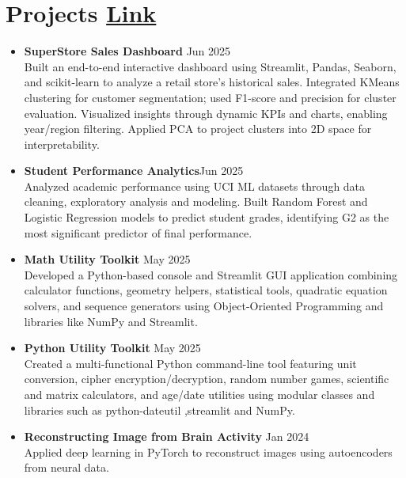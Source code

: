 \documentclass[10 pt, letterpaper]{article}
\begin{document}
\section*{Projects \textbar \href{https://github.com/Seetharamanrs?tab=repositories} {Link}}
\begin{itemize}
 \item \textbf{SuperStore Sales Dashboard } \hfill{Jun 2025} \\Built an end-to-end interactive dashboard using Streamlit, Pandas, Seaborn, and scikit-learn to analyze a retail store’s historical sales. Integrated KMeans clustering for customer segmentation; used F1-score and precision for cluster evaluation. Visualized insights through dynamic KPIs and charts, enabling year/region filtering. Applied PCA to project clusters into 2D space for interpretability.

    \vspace{-0.15cm}
     \item \textbf{Student Performance Analytics}\hfill{Jun 2025} \\Analyzed academic performance using UCI ML datasets through data cleaning, exploratory analysis and modeling. Built Random Forest and Logistic Regression models to predict student grades, identifying G2 as the most significant predictor of final performance.

    \vspace{-0.15cm}
    \item\textbf{Math Utility Toolkit }\hfill{ May 2025}\\ Developed a Python-based console and Streamlit GUI application combining calculator functions, geometry helpers, statistical tools, quadratic equation solvers, and sequence generators using Object-Oriented Programming and libraries like {NumPy} and {Streamlit}.
   \vspace{-0.15cm}
    \item\textbf{Python Utility Toolkit}\hfill{ May 2025}\\ Created a multi-functional Python command-line tool featuring unit conversion, cipher encryption/decryption, random number games, scientific and matrix calculators, and age/date utilities using modular classes and libraries such as {python-dateutil} ,{streamlit} and  {NumPy}.    
   \vspace{-0.15cm}
    \item \textbf{Reconstructing Image from Brain Activity}\hfill{ Jan 2024}\\Applied deep learning in PyTorch to reconstruct images using autoencoders from neural data.


\end{itemize}
\end{document}
